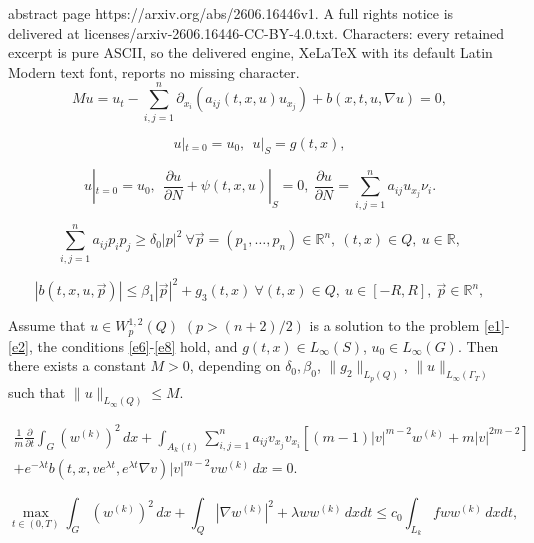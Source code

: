 \documentclass[10pt,a4paper]{amsart}
\begin{document}
abstract page https://arxiv.org/abs/2606.16446v1. A full rights notice is delivered at licenses/arxiv-2606.16446-CC-BY-4.0.txt. Characters: every retained excerpt is pure ASCII, so the delivered engine, XeLaTeX with its default Latin Modern text font, reports no missing character.
\begin{equation}\label{e1}
	Mu= u_t-\sum_{i,j=1}^n \partial_{x_i}(a_{ij}(t,x,u)u_{x_j})+ b(x,t,u,\nabla u)=0,
\end{equation}

\begin{equation}\label{e2}
	u|_{t=0}=u_0,\ \ u|_{S}= g(t,x), 
\end{equation}

\begin{equation}\label{e3}
	u|_{t=0}=u_0,\ \ \frac{\partial u}{\partial N}+ \psi(t,x,u)|_{S}=0, \ \frac{\partial u}{\partial N}= \sum_{i,j=1}^na_{ij}u_{x_j}\nu_i.
\end{equation}

\begin{equation}\label{e6}
\sum_{i,j=1}^na_{ij}p_ip_j\geq \delta_0|p|^2\  \forall \vec{p}=(p_1,\ldots,p_n) \in {\mathbb R}^n, \ (t,x)\in Q, \ u\in {\mathbb R},
\end{equation}

\begin{equation}\label{e8}
|b(t,x,u, \vec{p})|\leq \beta_1 |\vec{p}|^2 +g_3(t,x)\   \forall  (t,x)\in Q, \  u\in [-R,R], \ \vec{p}\in {\mathbb R}^n,
\end{equation}

\begin{theorem} \label{thr2}
Assume that  $u\in W_p^{1,2}(Q)$ $(p>(n+2)/2)$ is a  solution to the problem  {\rm \eqref{e1}-\eqref{e2}}, the conditions 
   {\rm \eqref{e6}-\eqref{e8}} hold, and   $g(t,x)\in L_\infty(S)$, $u_0\in L_\infty(G)$. 
Then there exists a constant  $M>0$, depending on $\delta_0, \beta_0$,  $\|g_2\|_{L_{p}(Q)}$, $\|u\|_{L_\infty(\Gamma_T)}$
such that  $\|u\|_{L_\infty(Q)}\leq M$. 
    \end{theorem}

\begin{multline}\label{e11}
\frac{1}{m}\frac{\partial}{\partial t} \int_G (w^{(k)})^2\,dx +\int_{A_k(t)} 
\sum_{i,j=1}^n a_{ij}v_{x_j}v_{x_i} [(m-1)|v|^{m-2}w^{(k)}+ m|v|^{2m-2}] \\ + 
e^{-\lambda t}b(t,x,ve^{\lambda t},e^{\lambda t}\nabla v)|v|^{m-2} v w^{(k)}\,dx=0.
\end{multline}

\begin{equation}\label{e15}
\max_{t\in (0,T)} \int_{G} (w^{(k)})^2\,dx +
\int_{Q} |\nabla w^{(k)}|^2+ \lambda  w w^{(k)}\,dxdt \leq  c_0\int_{L_k} f w w^{(k)} \,dxdt, 
\end{equation}
\end{document}
